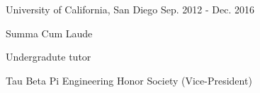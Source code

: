 

\begin{cventries}
  \cveducation
    {University of California, San Diego} 
    {Sep. 2012 - Dec. 2016} %
    {
      \vspace{-5mm}
      \begin{description}
        \item \hspace{-2mm}{Double Major}
        \begin{description}
          \item \hspace{-6mm}{B.S. Computer Science}
          \item \hspace{-6mm}{B.S. Applied Mathematics}
        \end{description}
      \end{description}
      \vspace{-5mm}
    }
    {
      \begin{cvitems} %
        \item {Summa Cum Laude}
        \item {Undergradute tutor}
        \item {Tau Beta Pi Engineering Honor Society (Vice-President)}
      \end{cvitems}
    }
    
\end{cventries}
